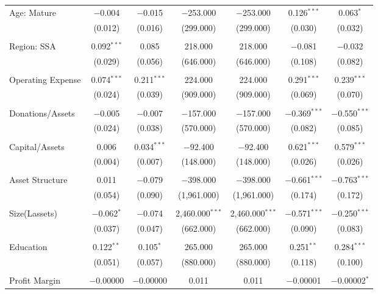 \documentclass[a4paper, nobind]{templates/ociamthesis}
\begin{document}
\begin{landscape}
\begin{table}[!htbp]
\begin{tabular}{@{\extracolsep{5pt}}lcccccc}
 Age: Mature & $-$0.004 & $-$0.015 & $-$253.000 & $-$253.000 & 0.126$^{***}$ & 0.063$^{*}$ \\ 
  & (0.012) & (0.016) & (299.000) & (299.000) & (0.030) & (0.032) \\ 
  & & & & & & \\ 
 Region: SSA & 0.092$^{***}$ & 0.085 & 218.000 & 218.000 & $-$0.081 & $-$0.032 \\ 
  & (0.029) & (0.056) & (646.000) & (646.000) & (0.108) & (0.082) \\ 
  & & & & & & \\ 
 Operating Expense & 0.074$^{***}$ & 0.211$^{***}$ & 224.000 & 224.000 & 0.291$^{***}$ & 0.239$^{***}$ \\ 
  & (0.024) & (0.039) & (909.000) & (909.000) & (0.069) & (0.070) \\ 
  & & & & & & \\ 
 Donations/Assets & $-$0.005 & $-$0.007 & $-$157.000 & $-$157.000 & $-$0.369$^{***}$ & $-$0.550$^{***}$ \\ 
  & (0.024) & (0.038) & (570.000) & (570.000) & (0.082) & (0.085) \\ 
  & & & & & & \\ 
 Capital/Assets & 0.006 & 0.034$^{***}$ & $-$92.400 & $-$92.400 & 0.621$^{***}$ & 0.579$^{***}$ \\ 
  & (0.004) & (0.007) & (148.000) & (148.000) & (0.026) & (0.026) \\ 
  & & & & & & \\ 
 Asset Structure & 0.011 & $-$0.079 & $-$398.000 & $-$398.000 & $-$0.661$^{***}$ & $-$0.763$^{***}$ \\ 
  & (0.054) & (0.090) & (1,961.000) & (1,961.000) & (0.174) & (0.172) \\ 
  & & & & & & \\ 
 Size(Lassets) & $-$0.062$^{*}$ & $-$0.074 & 2,460.000$^{***}$ & 2,460.000$^{***}$ & $-$0.571$^{***}$ & $-$0.250$^{***}$ \\ 
  & (0.037) & (0.047) & (662.000) & (662.000) & (0.090) & (0.083) \\ 
  & & & & & & \\ 
 Education & 0.122$^{**}$ & 0.105$^{*}$ & 265.000 & 265.000 & 0.251$^{**}$ & 0.284$^{***}$ \\ 
  & (0.051) & (0.057) & (880.000) & (880.000) & (0.118) & (0.100) \\ 
  & & & & & & \\ 
 Profit Margin & $-$0.00000 & $-$0.00000 & 0.011 & 0.011 & $-$0.00001 & $-$0.00002$^{*}$ \\ 

\end{tabular}
\end{table}
\end{landscape}
\end{document}
